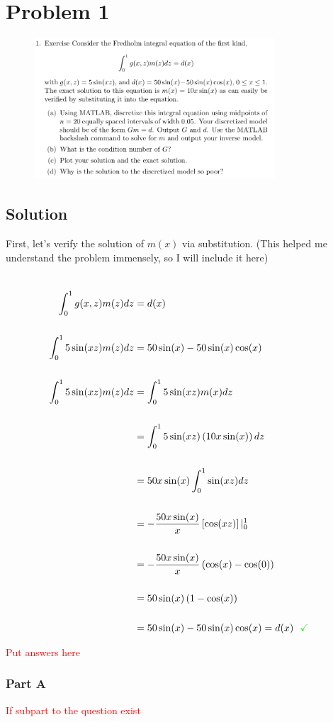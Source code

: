 
\begingroup
\allowdisplaybreaks

\newpage
\section{Problem 1}

\begin{figure}[h]
	\centering
	\includegraphics[width=0.8\textwidth]{./images/problem_1_statement.png}
\end{figure}

\subsection{Solution}

First, let's verify the solution of $m(x)$ via substitution. (This helped me understand the problem immensely, so I will include it here)

\begin{align*}
	\\
	\int_{0}^{1} g(x,z) m(z) dz &= d(x) \\
	\\
	\int_{0}^{1} 5 \sin(xz) m(z) dz &= 50 \sin(x) - 50 \sin(x) \cos(x) \\
	\\
	\int_{0}^{1} 5 \sin(xz) m(z) dz &= \int_{0}^{1} 5 \sin(xz) m(x) dz \\
	\\
	&= \int_{0}^{1} 5 \sin(xz) \left( 10 x \sin(x) \right) dz \\
	\\
	&= 50 x \sin(x) \int_{0}^{1} \sin(xz) dz \\
	\\
	&= - \frac{50 x \sin(x)}{x} \left[ \cos(xz) \right] |_{0}^{1} \\
	\\
	&= - \frac{50 x \sin(x)}{x} \left( \cos(x) - \cos(0) \right) \\
	\\
	&= 50 \sin(x) \left( 1 - \cos(x) \right) \\
	\\
	&= 50 \sin(x) - 50 \sin(x) \cos(x) = d(x) \,\,\,\, \textcolor{green}{\checkmark}
\end{align*}

\textcolor{red}{Put answers here}
	
\subsubsection{Part A}

\textcolor{red}{If subpart to the question exist}


